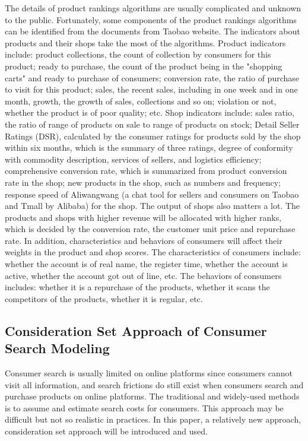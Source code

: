 \documentclass{article}
\begin{document}
The details of product rankings algorithms are usually complicated and unknown to the public. Fortunately, some components of the product rankings algorithms can be identified from the documents from Taobao website. The indicators about products and their shops take the most of the algorithms.
Product indicators include: product collections, the count of collection by consumers for this product; ready to purchase, the count of the product being in the "shopping carts" and ready to purchase of consumers; conversion rate, the ratio of purchase to visit for this product; sales, the recent sales, including in one week and in one month, growth, the growth of sales, collections and so on; violation or not, whether the product is of poor quality; etc.  
Shop indicators include: sales ratio, the ratio of range of products on sale to range of products on stock; Detail Seller Ratings (DSR), calculated by the consumer ratings for products sold by the shop within six months, which is the summary of three ratings, degree of conformity with commodity description, services of sellers, and logistics efficiency; comprehensive conversion rate, which is summarized from product conversion rate in the shop; new products in the shop, such as numbers and frequency; response speed of Aliwangwang (a chat tool for sellers and consumers on Taobao and Tmall by Alibaba) for the shop. 
The output of shops also matters a lot. The products and shops with higher revenue will be allocated with higher ranks, which is decided by the conversion rate, the customer unit price and repurchase rate. 
In addition, characteristics and behaviors of consumers will affect their weights in the product and shop scores. The characteristics of consumers include: whether the account is of real name, the register time, whether the account is active, whether the account got out of line, etc. The behaviors of consumers includes: whether it is a repurchase of the products, whether it scans the competitors of the products, whether it is regular, etc. 

\subsection{Consideration Set Approach of Consumer Search Modeling}

Consumer search is usually limited on online platforms since consumers cannot visit all information, and search frictions do still exist when consumers search and purchase products on online platforms. The traditional and widely-used methods is to assume and estimate search costs for consumers. This approach may be difficult but not so realistic in practices. In this paper, a relatively new approach, consideration set approach will be introduced and used. 
\end{document}
